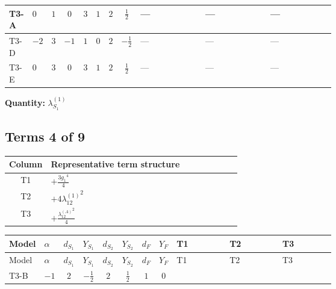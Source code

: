 \documentclass[8pt]{article}
\begin{document}
\begin{landscape}
\begin{longtable}{@{}llcccccc >{\raggedright\arraybackslash}p{0.21\linewidth} >{\raggedright\arraybackslash}p{0.21\linewidth} >{\raggedright\arraybackslash}p{0.21\linewidth}@{}}
\midrule
T3-A & $0$ & $1$ & $0$ & $3$ & $1$ & $2$ & $\frac{1}{2}$ & --- & --- & --- \\
\midrule
T3-D & $-2$ & $3$ & $-1$ & $1$ & $0$ & $2$ & $-\frac{1}{2}$ & --- & --- & --- \\
\midrule
T3-E & $0$ & $3$ & $0$ & $3$ & $1$ & $2$ & $\frac{1}{2}$ & --- & --- & --- \\
\midrule
\bottomrule
\end{longtable}
\clearpage
\noindent\textbf{Quantity: }$\lambda_{S_1}^{(1)}$\par\smallskip
\subsection*{Terms 4 of 9}
\begin{center}
\begin{tabular}{@{}c >{\raggedright\arraybackslash}p{0.82\linewidth}@{}}
\toprule
Column & Representative term structure \\
\midrule
T1 & \(\displaystyle +\frac{3 {g_1}^4}{4}\) \\
\midrule
T2 & \(\displaystyle +4 {\lambda_{12}^{(1)}}^2\) \\
\midrule
T3 & \(\displaystyle +\frac{{\lambda_{12}^{(A)}}^2}{4}\) \\
\midrule
\bottomrule
\end{tabular}
\end{center}
\smallskip
\tiny
\begin{longtable}{@{}llcccccc >{\raggedright\arraybackslash}p{0.21\linewidth} >{\raggedright\arraybackslash}p{0.21\linewidth} >{\raggedright\arraybackslash}p{0.21\linewidth}@{}}
\toprule
Model & $\alpha$ & $d_{S_1}$ & $Y_{S_1}$ & $d_{S_2}$ & $Y_{S_2}$ & $d_F$ & $Y_F$ & T1 & T2 & T3 \\
\midrule
\endfirsthead
\toprule
Model & $\alpha$ & $d_{S_1}$ & $Y_{S_1}$ & $d_{S_2}$ & $Y_{S_2}$ & $d_F$ & $Y_F$ & T1 & T2 & T3 \\
\midrule
\endhead
T3-B & $-1$ & $2$ & $-\frac{1}{2}$ & $2$ & $\frac{1}{2}$ & $1$ & $0$ & \scriptsize\adjustbox{max width=\linewidth}{$\begin{gathered} +\frac{3 {g_1}^4}{4}\end{gathered}$} & \scriptsize\adjustbox{max width=\linewidth}{$\begin{gathered} +4 {\lambda_{12}^{(1)}}^2\end{gathered}$} & \scriptsize\adjustbox{max width=\linewidth}{$\begin{gathered} +\frac{{\lambda_{12}^{(A)}}^2}{4}\end{gathered}$} \\

\end{longtable}
\end{landscape}
\end{document}
